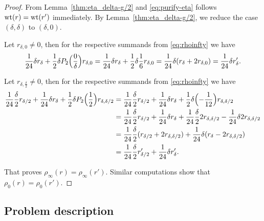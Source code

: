 \documentclass{article}
\begin{document}
\begin{AdditionalInformation}
\begin{proof}
From Lemma~\ref{thm:eta_delta-g/2} and \eqref{eq:purify-eta} follows
$\operatorname{wt}(r) = \operatorname{wt}(r')$ immediately.
%
By Lemma~\ref{thm:eta_delta-g/2}, we reduce the case $(\delta,\delta)$
to $(\delta,0)$.

Let $r_{\delta,0} \neq 0$, then for the respective summands from
\eqref{eq:rhoinfty} we have
\begin{gather*}
  \frac{1}{24}\delta r_\delta
  +
  \frac{1}{2} \delta P_2\Bigl(\frac{0}{\delta}\Bigr)r_{\delta,0}
  =
  \frac{1}{24}\delta r_\delta
  +
  \frac{1}{2} \delta \frac{1}{6} r_{\delta,0}
  =
  \frac{1}{24}\delta (r_\delta + 2 r_{\delta,0})
  =
  \frac{1}{24} \delta r'_\delta.
\end{gather*}

Let $r_{\delta,\frac{\delta}{2}} \neq 0$, then for the respective
summands from \eqref{eq:rhoinfty} we have
\begin{align*}
  \frac{1}{24} \frac{\delta}{2} r_{\delta/2}
  +
  \frac{1}{24} \delta r_{\delta}
  +
  \frac{1}{2} \delta P_2\Bigl(\frac{1}{2}\Bigr) r_{\delta,\delta/2}
  &=
    \frac{1}{24} \frac{\delta}{2} r_{\delta/2}
    +
    \frac{1}{24} \delta r_{\delta}
    +
    \frac{1}{2} \delta \Bigl(-\frac{1}{12}\Bigr) r_{\delta,\delta/2}
  \\
  &=
    \frac{1}{24} \frac{\delta}{2} r_{\delta/2}
    +
    \frac{1}{24} \delta r_{\delta}
    +
    \frac{1}{24} \frac{\delta}{2} 2 r_{\delta,\delta/2}
    -
    \frac{1}{24} \delta 2 r_{\delta,\delta/2}
  \\
  &=
    \frac{1}{24} \frac{\delta}{2} (r_{\delta/2} + 2 r_{\delta,\delta/2})
    +
    \frac{1}{24} \delta (r_{\delta} - 2 r_{\delta,\delta/2})
  \\
  &=
    \frac{1}{24} \frac{\delta}{2} r'_{\delta/2}
    +
    \frac{1}{24} \delta r'_{\delta}.
\end{align*}

That proves $\rho_\infty(r) = \rho_\infty(r')$.
Similar computations show that $\rho_0(r) = \rho_0(r')$.
\end{proof}
\end{AdditionalInformation}





\subsection{Problem description}
\end{document}

